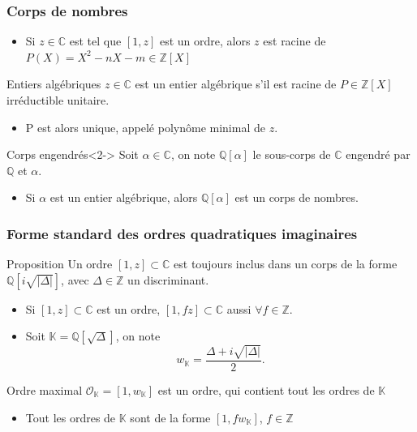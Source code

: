 \documentclass[11pt]{beamer}
\newcommand{\Z}[0]{\mathbb{Z}}
\newcommand{\Q}[0]{\mathbb{Q}}
\newcommand{\C}[0]{\mathbb{C}}
\newcommand{\K}[0]{\mathbb{K}}
\newcommand{\OR}[0]{\mathcal{O}}
\begin{document}
	\begin{frame}
		\frametitle{Corps de nombres}
		\begin{itemize}
			\item Si $z\in\C$ est tel que $[1,z]$ est un ordre,
			alors $z$ est racine de $P(X) = X^2 - nX - m\in\Z[X]$
		\end{itemize}
		\begin{block}{Entiers algébriques}
			$z\in\C$ est un entier algébrique s'il est racine de $P\in\Z[X]$ irréductible unitaire.
		\end{block}
		\begin{itemize}
			\item P est alors unique, appelé polynôme minimal de $z$. 
		\end{itemize}
		\begin{block}{Corps engendrés}<2->
			Soit $\alpha\in\C$, on note $\Q\left[\alpha\right] $ le sous-corps de $\C$ engendré par $\Q$ et $\alpha$.
		\end{block}
		\begin{itemize}
			\item<2-> Si $\alpha$ est un entier algébrique, alors $\Q\left[\alpha\right]$ est un corps de nombres.
		\end{itemize}
	\end{frame}
	
	\begin{frame}
		\frametitle{Forme standard des ordres quadratiques imaginaires}
		\begin{block}{Proposition}
			Un ordre $[1,z]\subset\C$ est toujours inclus dans un corps de la forme $\Q\left[i\sqrt{|\Delta|}\right] $, avec $\Delta\in\Z$ un discriminant.
		\end{block}
		\begin{itemize}
			\item Si $[1,z]\subset\C$ est un ordre, $[1,fz]\subset\C$ aussi $\forall f\in\Z$.
			\item Soit $\K = \Q\left[\sqrt{\Delta}\right]$, on note
			\begin{equation*}
				w_\K = \frac{\Delta + i\sqrt{|\Delta|}}{2}.
			\end{equation*}
		\end{itemize}
		\begin{block}{Ordre maximal}
			$\OR_\K = [1, w_\K]$ est un ordre, qui contient tout les ordres de $\K$
		\end{block}
		\begin{itemize}
			\item Tout les ordres de $\K$ sont de la forme $[1, fw_\K]$, $f\in\Z$
		\end{itemize}
	\end{frame}
	
\end{document}
